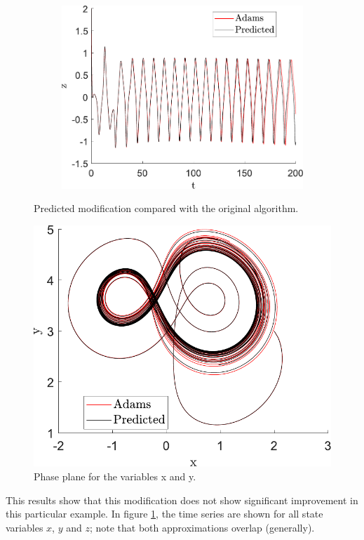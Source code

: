 \begin{figure}[H]
\begin{subfigure}[ht]{0.3\textwidth}
\includegraphics[scale=0.29]{files/adams_predicted_tz.pdf}
\end{subfigure}
\caption{Predicted modification compared with the original algorithm.}
\label{fig:predictedFinancial}
\end{figure}

\begin{figure}[H]
    \centering
    \includegraphics[scale=0.5]{files/adams_predicted_xy.pdf}
    \caption{Phase plane for the variables x and y.}
    \label{fig:predictedFinancialXY}
\end{figure}
This results show that this modification does not show significant improvement in this particular example. In figure \ref{fig:predictedFinancial}, the time series are shown for all state variables $x$, $y$ and $z$; note that both approximations overlap (generally). 

